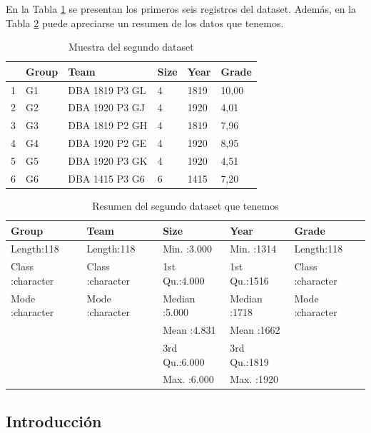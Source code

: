 En la Tabla \ref{table:6} se presentan los primeros seis registros del dataset. Además, en la Tabla \ref{table:7} puede apreciarse un resumen de los datos que tenemos.

\begin{table}[ht]
\centering
\begin{tabular}{rlllll}
  \hline
 & Group & Team & Size & Year & Grade \\ 
  \hline
1 & G1 & DBA 1819 P3 GL & 4 & 1819 & 10,00 \\ 
  2 & G2 & DBA 1920 P3 GJ & 4 & 1920 & 4,01 \\ 
  3 & G3 & DBA 1819 P2 GH & 4 & 1819 & 7,96 \\ 
  4 & G4 & DBA 1920 P2 GE & 4 & 1920 & 8,95 \\ 
  5 & G5 & DBA 1920 P3 GK & 4 & 1920 & 4,51 \\ 
  6 & G6 & DBA 1415 P3 G6 & 6 & 1415 & 7,20 \\ 
   \hline
\end{tabular}
\caption{Muestra del segundo dataset}
\label{table:6}
\end{table}

\begin{table}[ht]
\centering
\begin{tabular}{lllll}
  \hline
   Group &     Team &      Size &      Year &    Grade \\ 
  \hline
Length:118         & Length:118         & Min.   :3.000   & Min.   :1314   & Length:118         \\ 
  Class :character   & Class :character   & 1st Qu.:4.000   & 1st Qu.:1516   & Class :character   \\ 
  Mode  :character   & Mode  :character   & Median :5.000   & Median :1718   & Mode  :character   \\ 
   &  & Mean   :4.831   & Mean   :1662   &  \\ 
   &  & 3rd Qu.:6.000   & 3rd Qu.:1819   &  \\ 
   &  & Max.   :6.000   & Max.   :1920   &  \\ 
   \hline
\end{tabular}
\caption{Resumen del segundo dataset que tenemos}
\label{table:7}
\end{table}

\subsection{Introducción}

